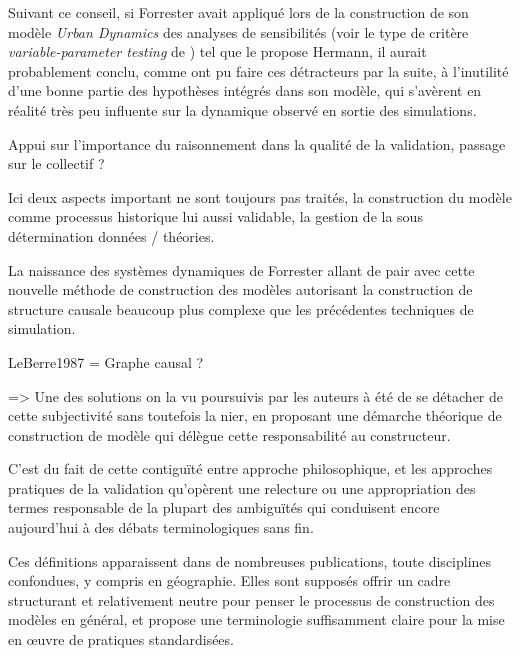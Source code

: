Suivant ce conseil, si Forrester avait appliqué lors de la construction de son modèle \textit{Urban Dynamics} des analyses de sensibilités (voir le type de critère \textit{variable-parameter testing} de \autocite{Hermann1967}) tel que le propose Hermann, il aurait probablement conclu, comme ont pu faire ces détracteurs par la suite, à l'inutilité d'une bonne partie des hypothèses intégrés dans son modèle, qui s'avèrent en réalité très peu influente sur la dynamique observé en sortie des simulations.

Appui sur l'importance du raisonnement dans la qualité de la validation, passage sur le collectif ?

Ici deux aspects important ne sont toujours pas traités, la construction du modèle comme processus historique lui aussi validable, la gestion de la sous détermination données / théories.


La naissance des systèmes dynamiques de Forrester allant de pair avec cette nouvelle méthode de construction des modèles autorisant la construction de structure causale beaucoup plus complexe que les précédentes techniques de simulation.

LeBerre1987 = Graphe causal ?



=> Une des solutions on la vu poursuivis par les auteurs à été de se détacher de cette subjectivité sans toutefois la nier, en proposant une démarche théorique de construction de modèle qui délègue cette responsabilité au constructeur.

C'est du fait de cette contiguïté entre approche philosophique, et les approches pratiques de la validation qu'opèrent une relecture ou une appropriation des termes responsable de la plupart des ambiguïtés qui conduisent encore aujourd'hui à des débats terminologiques sans fin. \autocite{David2009}

Ces définitions apparaissent dans de nombreuses publications, toute disciplines confondues, y compris en géographie. Elles sont supposés offrir un cadre structurant et relativement neutre pour penser le processus de construction des modèles en général, et propose une terminologie suffisamment claire pour la mise en œuvre de pratiques standardisées.

